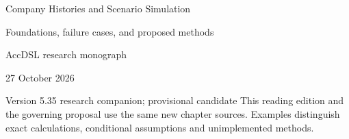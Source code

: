 \documentclass[11pt,a4paper]{report}
\begin{document}
\hypersetup{pageanchor=false}
\begin{titlepage}
{\Huge Company Histories and Scenario Simulation\par}
\vspace{12mm}
{\Large Foundations, failure cases, and proposed methods\par}
\vspace{8mm}
AccDSL research monograph\par 27 October 2026\par Version 5.35 research companion; provisional candidate
\vfill
This reading edition and the governing proposal use the same new chapter sources. Examples distinguish exact calculations, conditional assumptions and unimplemented methods.
\end{titlepage}
\hypersetup{pageanchor=true}
\tableofcontents
\clearpage{}


























\clearpage\label{sim:body-end}

\begingroup\raggedright
\endgroup
\end{document}
